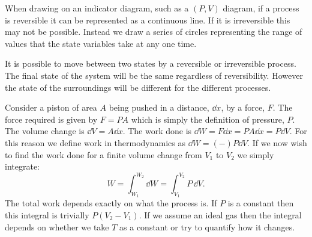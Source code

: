\documentclass[a4paper]{article}
\begin{document}
    When drawing on an indicator diagram, such as a \((P, V)\) diagram, if a process is reversible it can be represented as a continuous line.
    If it is irreversible this may not be possible.
    Instead we draw a series of circles representing the range of values that the state variables take at any one time.
    
    It is possible to move between two states by a reversible or irreversible process.
    The final state of the system will be the same regardless of reversibility.
    However the state of the surroundings will be different for the different processes.
    
    \begin{example}
        Consider a piston of area \(A\) being pushed in a distance, \(\dd{x}\), by a force, \(F\).
        The force required is given by \(F = PA\) which is simply the definition of pressure, \(P\).
        The volume change is \(\dd{V} = A\dd{x}\).
        The work done is \(\dd{W} = F\dd{x} = PA\dd{x} = P\dd{V}\).
        For this reason we define work in thermodynamics as \(\dd{W} = (-)P\dd{V}\).
        If we now wish to find the work done for a finite volume change from \(V_1\) to \(V_2\) we simply integrate:
        \[W = \int_{W_1}^{W_2}\dd{W} = \int_{V_1}^{V_2}P\,\dd{V}.\]
        The total work depends exactly on what the process is.
        If \(P\) is a constant then this integral is trivially \(P(V_2 - V_1)\).
        If we assume an ideal gas then the integral depends on whether we take \(T\) as a constant or try to quantify how it changes.
    \end{example}
\end{document}
